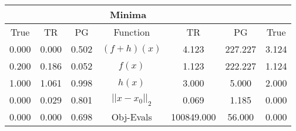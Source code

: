 \begin{tabular}{| c |c |c || c |c |c |c |}
    \hline
    \rowcolor[gray]{0.9}
\multicolumn{3}{|c|}{Parameters} & \multicolumn{4}{|c|}{Minima}\\ \hline True & TR & PG  & Function & TR & PG & True \\
    \hline
  \rowcolor[gray]{0.7}
  0.000 & 0.000 & 0.502   & $ (f + h)(x) $ & 4.123 & 227.227 & 3.124 \\
  \rowcolor[gray]{0.8}
  0.200 & 0.186 & 0.052   & $ f(x) $ & 1.123 & 222.227 & 1.124 \\
  \rowcolor[gray]{0.7}
  1.000 & 1.061 & 0.998   & $ h(x) $ & 3.000 & 5.000 & 2.000 \\
  \rowcolor[gray]{0.8}
  0.000 & 0.029 & 0.801   & $ ||x - x_0||_2 $ & 0.069 & 1.185 & 0.000 \\
  \rowcolor[gray]{0.7}
  0.000 & 0.000 & 0.698   & Obj-Evals & 100849.000 & 56.000 & 0.000 \\
\end{tabular}
